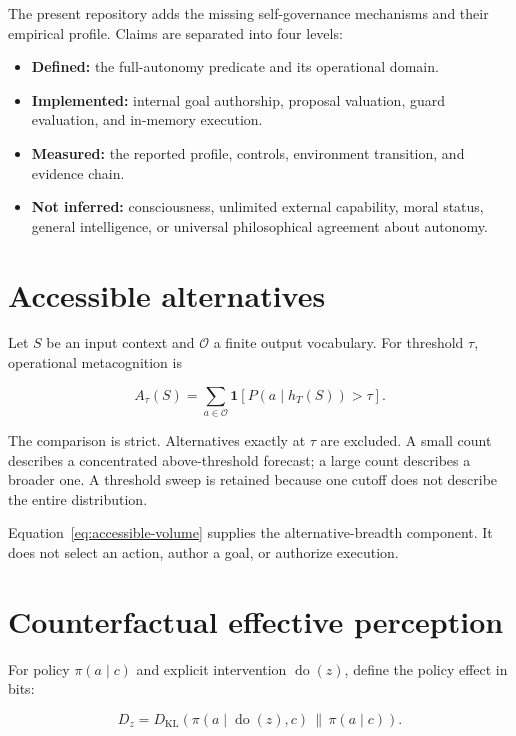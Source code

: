 \documentclass[11pt,a4paper]{article}
\begin{document}
The present repository adds the missing self-governance mechanisms and their empirical profile. Claims are separated into four levels:

\begin{itemize}[nosep]
  \item \textbf{Defined:} the full-autonomy predicate and its operational domain.
  \item \textbf{Implemented:} internal goal authorship, proposal valuation, guard evaluation, and in-memory execution.
  \item \textbf{Measured:} the reported profile, controls, environment transition, and evidence chain.
  \item \textbf{Not inferred:} consciousness, unlimited external capability, moral status, general intelligence, or universal philosophical agreement about autonomy.
\end{itemize}

\section{Accessible alternatives}
Let $S$ be an input context and $\mathcal O$ a finite output vocabulary. For threshold $\tau$, operational metacognition is

\begin{equation}
A_\tau(S)=\sum_{a\in\mathcal O}\mathbf 1\!\left[P(a\mid h_T(S))>\tau\right].
\label{eq:accessible-volume}
\end{equation}

The comparison is strict. Alternatives exactly at $\tau$ are excluded. A small count describes a concentrated above-threshold forecast; a large count describes a broader one. A threshold sweep is retained because one cutoff does not describe the entire distribution.

Equation~\ref{eq:accessible-volume} supplies the alternative-breadth component. It does not select an action, author a goal, or authorize execution.

\section{Counterfactual effective perception}
For policy $\pi(a\mid c)$ and explicit intervention $\operatorname{do}(z)$, define the policy effect in bits:

\begin{equation}
D_z=D_{\mathrm{KL}}\!\left(
\pi(a\mid\operatorname{do}(z),c)\,\middle\|\,\pi(a\mid c)
\right).
\end{equation}
\end{document}
